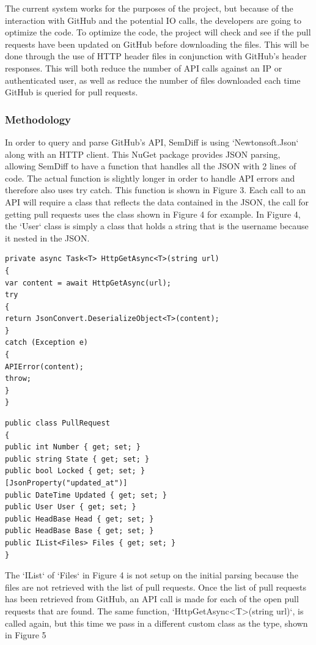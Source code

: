 \documentclass[10pt,draftclsnofoot,onecolumn]{IEEEtran}
\begin{document}
The current system works for the purposes of the project, but because of the interaction with GitHub and the potential IO calls, the developers are going to optimize the code. To optimize the code, the project will check and see if the pull requests have been updated on GitHub before downloading the files. This will be done through the use of HTTP header files in conjunction with GitHub’s header responses. This will both reduce the number of API calls against an IP or authenticated user, as well as reduce the number of files downloaded each time GitHub is queried for pull requests. 

\subsubsection{Methodology}
In order to query and parse GitHub’s API, SemDiff is using `Newtonsoft.Json` along with an HTTP client. This NuGet package provides JSON parsing, allowing SemDiff to have a function that handles all the JSON with 2 lines of code. The actual function is slightly longer in order to handle API errors and therefore also uses try catch. This function is shown in Figure 3. Each call to an API will require a class that reflects the data contained in the JSON, the call for getting pull requests uses the class shown in Figure 4 for example. In Figure 4, the `User` class is simply a class that holds a string that is the username because it nested in the JSON.

\begingroup
\begin{lstlisting}
private async Task<T> HttpGetAsync<T>(string url)
{
var content = await HttpGetAsync(url);
try
{
return JsonConvert.DeserializeObject<T>(content);
}
catch (Exception e)
{
APIError(content);
throw;
}
}
\end{lstlisting}
\endgroup

\begingroup
\begin{lstlisting}
public class PullRequest
{
public int Number { get; set; }
public string State { get; set; }
public bool Locked { get; set; }
[JsonProperty("updated_at")]
public DateTime Updated { get; set; }
public User User { get; set; }
public HeadBase Head { get; set; }
public HeadBase Base { get; set; }
public IList<Files> Files { get; set; }
}
\end{lstlisting}
\endgroup

The `IList` of `Files` in Figure 4 is not setup on the initial parsing because the files are not retrieved with the list of pull requests. Once the list of pull requests has been retrieved from GitHub, an API call is made for each of the open pull requests that are found. The same function, `HttpGetAsync<T>(string url)`, is called again, but this time we pass in a different custom class as the type, shown in Figure 5
\end{document}
